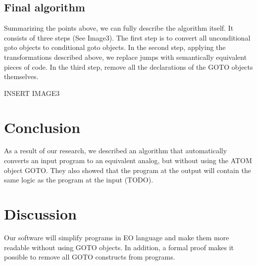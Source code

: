 \documentclass[sigplan,review,11pt,nonacm,natbib=false]{acmart}
\begin{document}
\subsection{Final algorithm}
Summarizing the points above, we can fully describe the algorithm itself. It consists of three steps (See Image3). The first step is to convert all unconditional goto objects to conditional goto objects. In the second step, applying the transformations described above, we replace jumps with semantically equivalent pieces of code. In the third step, remove all the declarations of the GOTO objects themselves.

{INSERT IMAGE3}

\section{Conclusion}
As a result of our research, we described an algorithm that automatically converts an input program to an equivalent analog, but without using the ATOM object GOTO. They also showed that the program at the output will contain the same logic as the program at the input (TODO).

\section{Discussion}
Our software will simplify programs in EO language and make them more readable without using GOTO objects. In addition, a formal proof makes it possible to remove all GOTO constructs from programs.
\end{document}
